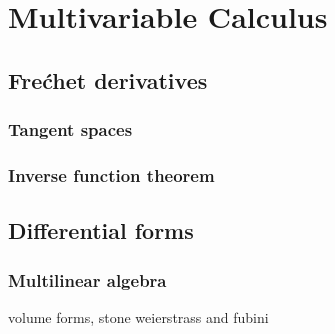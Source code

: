 \documentclass{../note}
\begin{document}
\chapter{}





\part{Multivariable Calculus}
\chapter{Fre\'chet derivatives}
\section{Tangent spaces}
\begin{prb}

\end{prb}

\section{Inverse function theorem}






\chapter{Differential forms}
\section{Multilinear algebra}

\begin{prb}
\end{prb}

\begin{prb}
\end{prb}



\begin{prb}
\end{prb}


\begin{prb}
volume forms,
stone weierstrass and fubini
\end{prb}
\end{document}
